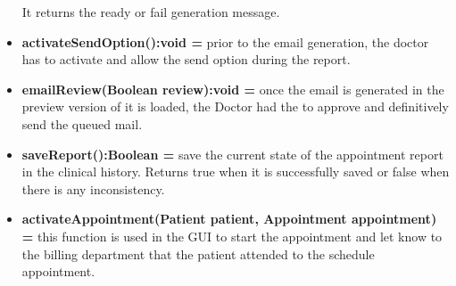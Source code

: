 \documentclass{article}
\begin{document}
\begin{itemize}
                It returns the ready or fail generation message.
                \item \textbf{activateSendOption():void = } prior to the email generation, the doctor has to activate and allow the send option during the report.
                \item \textbf{emailReview(Boolean review):void = } once the email is generated in the preview version of it is loaded, the Doctor had the to approve and definitively send the queued mail.
                \item \textbf{saveReport():Boolean = } save the current state of the appointment report in the clinical history. Returns true when it is successfully saved or false when there is any inconsistency.
                \item \textbf{activateAppointment(Patient patient, Appointment appointment) = } this function is used in the GUI to start the appointment and let know to the billing department that the patient attended to the schedule appointment.
            \end{itemize}
            
\end{document}
